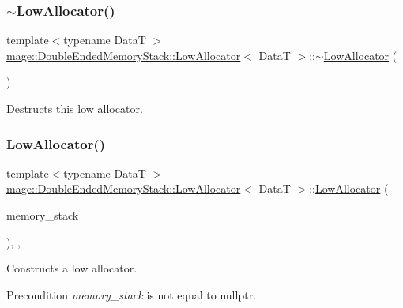 \subsubsection{\texorpdfstring{$\sim$\+Low\+Allocator()}{~LowAllocator()}}
{\footnotesize\ttfamily template$<$typename DataT $>$ \\
\hyperlink{classmage_1_1_double_ended_memory_stack_1_1_low_allocator}{mage\+::\+Double\+Ended\+Memory\+Stack\+::\+Low\+Allocator}$<$ DataT $>$\+::$\sim$\hyperlink{classmage_1_1_double_ended_memory_stack_1_1_low_allocator}{Low\+Allocator} (\begin{DoxyParamCaption}{ }\end{DoxyParamCaption})\hspace{0.3cm}{\ttfamily [default]}}

Destructs this low allocator. \hypertarget{classmage_1_1_double_ended_memory_stack_1_1_low_allocator_a7c9da2fad702eedb0bb16de047c99238}{}\label{classmage_1_1_double_ended_memory_stack_1_1_low_allocator_a7c9da2fad702eedb0bb16de047c99238} 
\subsubsection{\texorpdfstring{Low\+Allocator()}{LowAllocator()}\hspace{0.1cm}{\footnotesize\ttfamily [4/4]}}
{\footnotesize\ttfamily template$<$typename DataT $>$ \\
\hyperlink{classmage_1_1_double_ended_memory_stack_1_1_low_allocator}{mage\+::\+Double\+Ended\+Memory\+Stack\+::\+Low\+Allocator}$<$ DataT $>$\+::\hyperlink{classmage_1_1_double_ended_memory_stack_1_1_low_allocator}{Low\+Allocator} (\begin{DoxyParamCaption}\item[{\hyperlink{classmage_1_1_double_ended_memory_stack}{Double\+Ended\+Memory\+Stack} $\ast$}]{memory\+\_\+stack }\end{DoxyParamCaption})\hspace{0.3cm}{\ttfamily [explicit]}, {\ttfamily [private]}, {\ttfamily [noexcept]}}

Constructs a low allocator.

\begin{DoxyPrecond}{Precondition}
{\itshape memory\+\_\+stack} is not equal to {\ttfamily nullptr}. 
\end{DoxyPrecond}

